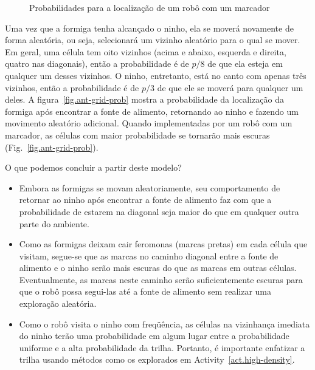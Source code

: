 \begin{figure}
\begin{center}
\end{center}
\caption{Probabilidades para a localização de um robô com um marcador}\label{fig.ant-grid-gray}
\end{figure}

Uma vez que a formiga tenha alcançado o ninho, ela se moverá novamente de forma aleatória, ou seja, selecionará um vizinho aleatório para o qual se mover. Em geral, uma célula tem oito vizinhos (acima e abaixo, esquerda e direita, quatro nas diagonais), então a probabilidade é de $p/8$ de que ela esteja em qualquer um desses vizinhos. O ninho, entretanto, está no canto com apenas três vizinhos, então a probabilidade é de $p/3$ de que ele se moverá para qualquer um deles. A figura~\ref{fig.ant-grid-prob} mostra a probabilidade da localização da formiga após encontrar a fonte de alimento, retornando ao ninho e fazendo um movimento aleatório adicional. Quando implementadas por um robô com um marcador, as células com maior probabilidade se tornarão mais escuras (Fig.~\ref{fig.ant-grid-prob}).

O que podemos concluir a partir deste modelo?
\begin{itemize}
\item Embora as formigas se movam aleatoriamente, seu comportamento de retornar ao ninho após encontrar a fonte de alimento faz com que a probabilidade de estarem na diagonal seja maior do que em qualquer outra parte do ambiente. 
\item Como as formigas deixam cair feromonas (marcas pretas) em cada célula que visitam, segue-se que as marcas no caminho diagonal entre a fonte de alimento e o ninho serão mais escuras do que as marcas em outras células. Eventualmente, as marcas neste caminho serão suficientemente escuras para que o robô possa segui-las até a fonte de alimento sem realizar uma exploração aleatória.
\item Como o robô visita o ninho com freqüência, as células na vizinhança imediata do ninho terão uma probabilidade em algum lugar entre a probabilidade uniforme e a alta probabilidade da trilha. Portanto, é importante enfatizar a trilha usando métodos como os explorados em Activity~\ref{act.high-density}.
\end{itemize}

